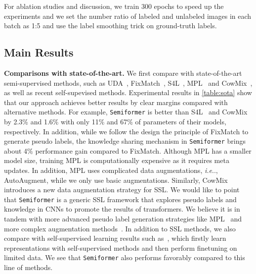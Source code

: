 \documentclass[runningheads]{llncs}
\makeatletter
\DeclareRobustCommand\onedot{\futurelet\@let@token\@onedot}
\def\@onedot{\ifx\@let@token.\else.\null\fi\xspace}
\def\ie{\emph{i.e}\onedot} \def\Ie{\emph{I.e}\onedot}
\newcommand{\fakeparagraph}[1]{\textbf{#1}}
\newcommand*{\system}{\texttt{Semiformer}\@\xspace}
\makeatother
\begin{document}
For ablation studies and discussion, we train 300 epochs to speed up the experiments and we set the number ratio of labeled and unlabeled images in each batch as 1:5 and use the label smoothing trick on ground-truth labels.


\subsection{Main Results}

\fakeparagraph{Comparisons with state-of-the-art.} We first compare with state-of-the-art semi-supervised methods, such as UDA~\cite{xie2020unsupervised}, FixMatch~\cite{sohn2020fixmatch}, S4L~\cite{zhai2019s4l}, MPL~\cite{pham2021meta} and CowMix~\cite{french2020milking}, as well as recent self-supevised methods. Experimental results in \cref{table:sota} show that our approach achieves better results by clear margins compared with alternative methods. For example, \system is better than S4L~\cite{zhai2019s4l} and CowMix~\cite{french2020milking} by 2.3\% and 1.6\% with only 11\% and 67\% of parameters of their models, respectively. In addition, while we follow the design the principle of FixMatch to generate pseudo labels, the knowledge sharing mechanism in \system brings about 4\% performance gain compared to FixMatch.  Although MPL has a smaller model size, training MPL is computationally expensive as it requires meta updates. In addition, MPL uses complicated data augmentations, \ie, AutoAugment, while we only use basic augmentations. Similarly, CowMix~\cite{french2020milking} introduces a new data augmentation strategy for SSL. We would like to point that \system is a generic SSL framework that explores pseudo labels and knowledge in CNNs to promote the results of transformers.  We believe it is in tandem with more advanced pseudo label generation strategies like MPL~\cite{pham2021meta} and more complex augmentation methods~\cite{french2020milking}. In addition to SSL methods, we also compare with self-supervised learning results such as~\cite{henaff2020data,chen2020big,grill2020bootstrap}, which firstly learn representations with self-supervised methods and then perform finetuning on limited data. We see that \system also performs favorably compared to this line of methods.
\end{document}

